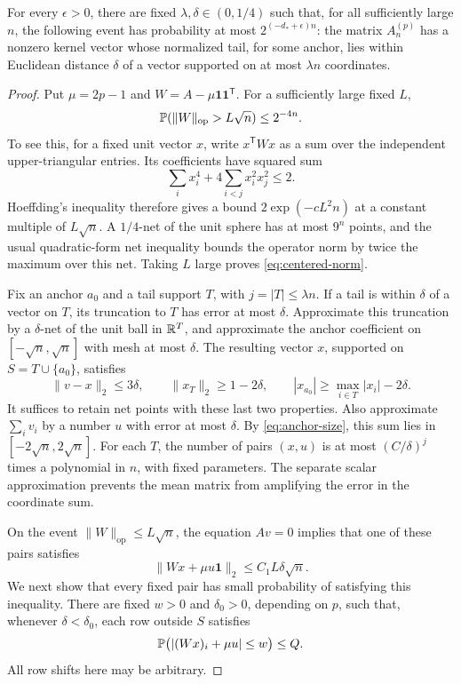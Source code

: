 \begin{lemma}\label{lem:compressible}
For every \(\epsilon>0\), there are fixed
\(\lambda,\delta\in(0,1/4)\) such that, for all sufficiently large
\(n\), the following event has probability at most
\(2^{(-d_*+\epsilon)n}\): the matrix \(A_n^{(p)}\) has a nonzero
kernel vector whose normalized tail, for some anchor, lies within
Euclidean distance \(\delta\) of a vector supported on at most
\(\lambda n\) coordinates.
\end{lemma}

\begin{proof}
Put \(\mu=2p-1\) and
\(W=A-\mu\mathbf1\mathbf1^{\mathsf T}\). For a sufficiently large
fixed \(L\),
\begin{equation}\label{eq:centered-norm}
 \mathbb P(\lVert W\rVert_{\mathrm{op}}>L\sqrt n)\le 2^{-4n}.
\end{equation}
To see this, for a fixed unit vector \(x\), write \(x^{\mathsf T}Wx\)
as a sum over the independent upper-triangular entries. Its
coefficients have squared sum
\[
 \sum_i x_i^4+4\sum_{i<j}x_i^2x_j^2\le2.
\]
Hoeffding's inequality \cite[Theorem~2]{Hoeffding} therefore gives
a bound \(2\exp(-cL^2n)\) at a constant multiple of \(L\sqrt n\).
A \(1/4\)-net of the unit sphere has at most \(9^n\) points, and
the usual quadratic-form net inequality bounds the operator norm
by twice the maximum over this net. Taking \(L\) large proves
\eqref{eq:centered-norm}.

Fix an anchor \(a_0\) and a tail support \(T\), with
\(j=|T|\le\lambda n\). If a tail is within \(\delta\) of a vector
on \(T\), its truncation to \(T\) has error at most \(\delta\).
Approximate this truncation by a \(\delta\)-net of the unit ball
in \(\mathbb R^T\), and approximate the anchor coefficient on
\([-\sqrt n,\sqrt n]\) with mesh at most \(\delta\).
The resulting vector \(x\), supported on
\(S=T\cup\{a_0\}\), satisfies
\[
 \lVert v-x\rVert_2\le3\delta,\qquad
 \lVert x_T\rVert_2\ge1-2\delta,\qquad
 |x_{a_0}|\ge\max_{i\in T}|x_i|-2\delta.
\]
It suffices to retain net points with these last two properties.
Also approximate \(\sum_i v_i\) by a number \(u\) with error at
most \(\delta\). By \eqref{eq:anchor-size}, this sum lies in
\([-2\sqrt n,2\sqrt n]\).
For each \(T\), the number of pairs \((x,u)\) is at most
\((C/\delta)^j\) times a polynomial in \(n\), with fixed parameters.
The separate scalar approximation prevents the mean matrix from
amplifying the error in the coordinate sum.

On the event \(\lVert W\rVert_{\mathrm{op}}\le L\sqrt n\),
the equation \(Av=0\)
implies that one of these pairs satisfies
\begin{equation}\label{eq:net-residual}
 \lVert Wx+\mu u\mathbf1\rVert_2
 \le C_1L\delta\sqrt n.
\end{equation}
We next show that every fixed pair has small probability of
satisfying this inequality. There are fixed \(w>0\) and
\(\delta_0>0\), depending on \(p\), such that, whenever
\(\delta<\delta_0\), each row outside \(S\) satisfies
\begin{equation}\label{eq:two-sign-concentration}
 \mathbb P\bigl(|(Wx)_i+\mu u|\le w\bigr)\le Q.
\end{equation}
All row shifts here may be arbitrary.


\end{proof}

